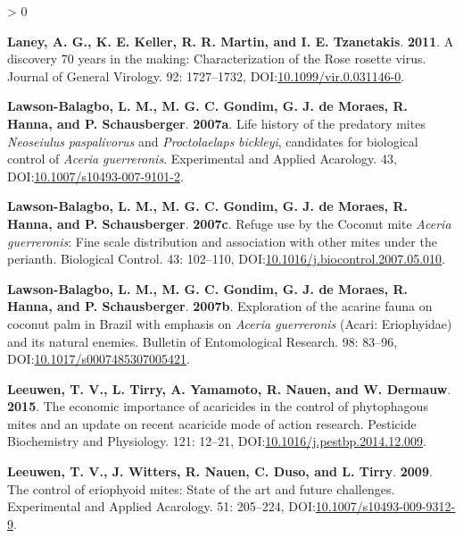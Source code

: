 \documentclass{ufdissertation}[overrideChapters] %
\newlength{\cslhangindent}
\newenvironment{CSLReferences}[2] %
 {%
  \setlength{\parindent}{0pt}
  \ifodd #1 \everypar{\setlength{\hangindent}{\cslhangindent}}\ignorespaces\fi
  \ifnum #2 > 0
  \setlength{\parskip}{#2\baselineskip}
  \fi
 }%
 {}
\begin{document}
{\begin{CSLReferences}{1}{1}
\leavevmode{}%
\textbf{Laney, A. G., K. E. Keller, R. R. Martin, and I. E. Tzanetakis}. \textbf{2011}. A discovery 70 years in the making: Characterization of the {Rose rosette virus}. Journal of General Virology. 92: 1727--1732, DOI:\href{https://doi.org/10.1099/vir.0.031146-0}{10.1099/vir.0.031146-0}.

\leavevmode{}%
\textbf{Lawson-Balagbo, L. M., M. G. C. Gondim, G. J. de Moraes, R. Hanna, and P. Schausberger}. \textbf{2007a}. Life history of the predatory mites {\emph{Neoseiulus}} {\emph{paspalivorus}} and {\emph{Proctolaelaps}} {\emph{bickleyi}}, candidates for biological control of {\emph{Aceria}} {\emph{guerreronis}}. Experimental and Applied Acarology. 43, DOI:\href{https://doi.org/10.1007/s10493-007-9101-2}{10.1007/s10493-007-9101-2}.

\leavevmode{}%
\textbf{Lawson-Balagbo, L. M., M. G. C. Gondim, G. J. de Moraes, R. Hanna, and P. Schausberger}. \textbf{2007c}. Refuge use by the {Coconut mite} {\emph{Aceria guerreronis}}: Fine scale distribution and association with other mites under the perianth. Biological Control. 43: 102--110, DOI:\href{https://doi.org/10.1016/j.biocontrol.2007.05.010}{10.1016/j.biocontrol.2007.05.010}.

\leavevmode{}%
\textbf{Lawson-Balagbo, L. M., M. G. C. Gondim, G. J. de Moraes, R. Hanna, and P. Schausberger}. \textbf{2007b}. Exploration of the acarine fauna on coconut palm in {Brazil} with emphasis on {\emph{Aceria guerreronis}} ({Acari}: {Eriophyidae}) and its natural enemies. Bulletin of Entomological Research. 98: 83--96, DOI:\href{https://doi.org/10.1017/s0007485307005421}{10.1017/s0007485307005421}.

\leavevmode{}%
\textbf{Leeuwen, T. V., L. Tirry, A. Yamamoto, R. Nauen, and W. Dermauw}. \textbf{2015}. The economic importance of acaricides in the control of phytophagous mites and an update on recent acaricide mode of action research. Pesticide Biochemistry and Physiology. 121: 12--21, DOI:\href{https://doi.org/10.1016/j.pestbp.2014.12.009}{10.1016/j.pestbp.2014.12.009}.

\leavevmode{}%
\textbf{Leeuwen, T. V., J. Witters, R. Nauen, C. Duso, and L. Tirry}. \textbf{2009}. The control of eriophyoid mites: State of the art and future challenges. Experimental and Applied Acarology. 51: 205--224, DOI:\href{https://doi.org/10.1007/s10493-009-9312-9}{10.1007/s10493-009-9312-9}.


\end{CSLReferences}}
\end{document}
